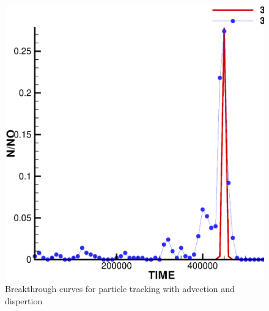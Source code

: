 \begin{figure}[htbp!]
\centering
\includegraphics[scale=0.35]{PART_II/C/CubeBTC.eps}
\caption{Breakthrough curves for particle tracking with advection and dispertion}
\label{CubeBTC}
\end{figure}